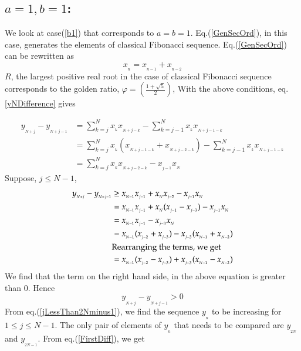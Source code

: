 \begin{multicols}{2}
\section{\underline{$a=1, b =1$}:}\label{section-16}
We look at case(\ref{b1}) that corresponds to $a = b = 1$. Eq.(\ref{GenSecOrd}), in this case, generates the elements of classical Fibonacci sequence. Eq.(\ref{GenSecOrd}) can be rewritten as
\begin{equation}
x_{_n} = x_{_{n-1}} + x_{_{n-2}}\label{eq-16.1}
\end{equation}
$R$, the largest positive real root in the case of classical Fibonacci sequence corresponds to the golden ratio, $\varphi = \displaystyle{\left(\frac{1+\sqrt5}{2}\right)}$,
With the above conditions, eq.\ref{yNDifference} gives

\begin{align}
y_{_{N+j}} - y_{_{N+j-1}} &= \displaystyle{\sum_{k=j}^{N}}x_{_{k}}x_{_{N+j-k}} -  \displaystyle{\sum_{k=j-1}^{N}}x_{_k}x_{_{N+j-1-k}}\label{eq-16.2}\\
&= \displaystyle{\sum_{k=j}^{N}}x_{_{k}}(x_{_{N+j-1-k}}+x_{_{N+j-2-k}}) -  \displaystyle{\sum_{k=j-1}^{N}}x_{_k}x_{_{N+j-1-k}}\nonumber\\
&= \displaystyle{\sum_{k=j}^{N}}x_{_{k}}x_{_{N+j-2-k}} - x_{_{j-1}}x_{_N}\nonumber
\end{align}
Suppose, $j \leq N-1$,
\begin{align*}
y_{_{N+j}} - y_{_{N+j-1}} &\geq x_{_{N-1}}x_{_{j-1}} + x_{_N}x_{_{j-2}} - x_{_{j-1}}x_{_N}\nonumber\\
&= x_{_{N-1}}x_{_{j-1}} + x_{_N}(x_{_{j-1}}-x_{_{j-3}})- x_{_{j-1}}x_{_N}\nonumber\\
&= x_{_{N-1}}x_{_{j-1}} - x_{_{j-3}}x_{_N}\nonumber\\
&= x_{_{N-1}}(x_{_{j-2}}+x_{_{j-3}}) - x_{_{j-3}}(x_{_{N-1}}+x_{_{N-2}})\nonumber\\
&\textup{Rearranging the terms, we get}\nonumber\\
&= x_{_{N-1}}(x_{_{j-2}} - x_{_{j-3}}) + x_{_{j-3}}(x_{_{N-1}} - x_{_{N-2}})\nonumber
\end{align*}
We find that the term on the right hand side, in the above equation is greater than 0. Hence
\begin{equation}
y_{_{N+j}} - y_{_{N+j-1}} > 0\label{eq-16.3}
\end{equation}
From eq.(\ref{jLessThan2Nminus1}), we find the sequence $y_{_n}$ to be increasing for $1 \leq j \leq N-1$. The only pair of elements of $y_{_n}$ that needs to be compared are $y_{_{2N}}$ and $y_{_{2N-1}}$. From eq.(\ref{FirstDiff}), we get

\end{multicols}
